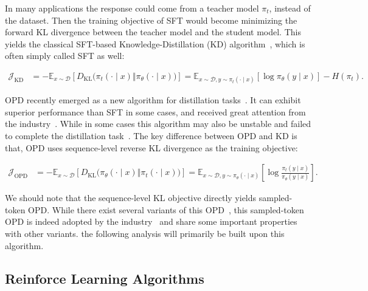 In many applications the response could come from a teacher model $\pi_t$, instead of the dataset. Then the training objective of SFT would become minimizing the forward KL divergence between the teacher model and the student model. This yields the classical SFT-based Knowledge-Distillation (KD) algorithm~\citep{hinton_distilling_2015}, which is often simply called SFT as well:

\begin{align}
  \mathcal{J}_{\mathrm{KD}} &= -\mathbb{E}_{x\sim\mathcal{D}} [D_{\mathrm{KL}}\bigl(\pi_t (\cdot\mid x)\Vert \pi_\theta (\cdot\mid x)\bigr)] = \mathbb{E}_{x\sim\mathcal{D}, y\sim\pi_t (\cdot\mid x)} [\log \pi_\theta (y\mid x)] - H(\pi_t).
  \label{eq:kl-loss}
\end{align}

OPD recently emerged as a new algorithm for distillation tasks~\citep{thinking_machines_lab_-policy_2025}. It can exhibit superior performance than SFT in some cases, and received great attention from the industry~\citep{team_kimi_2026, deepseek-ai_deepseek-v4_2026, glm-5-team_glm-5_2026}. While in some cases this algorithm may also be unstable and failed to complete the distillation task~\citep{li_rethinking_2026}. The key difference between OPD and KD is that, OPD uses sequence-level reverse KL divergence as the training objective:

\begin{align}
  \mathcal{J}_{\mathrm{OPD}} &= -\mathbb{E}_{x\sim\mathcal{D}} [D_{\mathrm{KL}}\bigl(\pi_\theta (\cdot\mid x)\Vert \pi_t (\cdot\mid x)\bigr)]
  = \mathbb{E}_{x\sim\mathcal{D}, y\sim\pi_\theta (\cdot\mid x)} [\log \frac{\pi_t (y\mid x)}{\pi_\theta (y\mid x)}].
  \label{eq:opd-loss}
\end{align}


We should note that the sequence-level KL objective directly yields sampled-token OPD. While there exist several variants of this OPD~\citep{li_rethinking_2026}, this sampled-token OPD is indeed adopted by the industry~\citep{team_kimi_2026} and share some important properties with other variants. the following analysis will primarily be built upon this algorithm.

\subsection{Reinforce Learning Algorithms}

